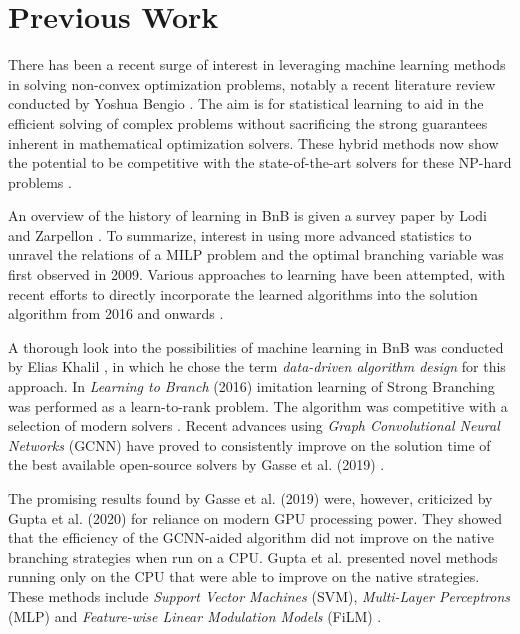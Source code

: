 \section{Previous Work}\label{sec:int_previouswork}

There has been a recent surge of interest in leveraging machine learning methods in solving non-convex optimization problems, notably a recent literature review conducted by Yoshua Bengio \cite{bengio2020machine}. The aim is for statistical learning to aid in the efficient solving of complex problems without sacrificing the strong guarantees inherent in mathematical optimization solvers. These hybrid methods now show the potential to be competitive with the state-of-the-art solvers for these \gls{NP}-hard problems \cite{gasse2019exact}. 

An overview of the history of learning in \gls{BnB} is given a survey paper by Lodi and Zarpellon \cite{lodi2017learning}. To summarize, interest in using more advanced statistics to unravel the relations of a \gls{MILP} problem and the optimal branching variable was first observed in 2009. Various approaches to learning have been attempted, with recent efforts to directly incorporate the learned algorithms into the solution algorithm from 2016 and onwards \cite{lodi2017learning}.  

A thorough look into the possibilities of machine learning in \gls{BnB} was conducted by Elias Khalil \cite{khalil2020towards}, in which he chose the term \textit{data-driven algorithm design} for this approach. 
In \textit{Learning to Branch} (2016) \cite{khalil2016learning} imitation learning of Strong Branching was performed as a learn-to-rank problem. The algorithm was competitive with a selection of modern solvers \cite{khalil2016learning}. 
Recent advances using\textit{ Graph Convolutional Neural Networks} (\Gls{GCNN}) have proved to consistently improve on the solution time of the best available open-source solvers by Gasse et al. (2019) \cite{gasse2019exact}. 

The promising results found by Gasse et al. (2019) \cite{gasse2019exact} were, however, criticized by Gupta et al. (2020) \cite{gupta2020hybrid} for reliance on modern \gls{GPU} processing power. They showed that the efficiency of the \gls{GCNN}-aided algorithm did not improve on the native branching strategies when run on a \gls{CPU}. Gupta et al. presented novel methods running only on the \gls{CPU} that were able to improve on the native strategies. These methods include \textit{Support Vector Machines} (\Gls{SVM}), \textit{Multi-Layer Perceptrons} (\Gls{MLP}) and  \textit{Feature-wise Linear Modulation Models} (\gls{FiLM}) \cite{gupta2020hybrid}. 

